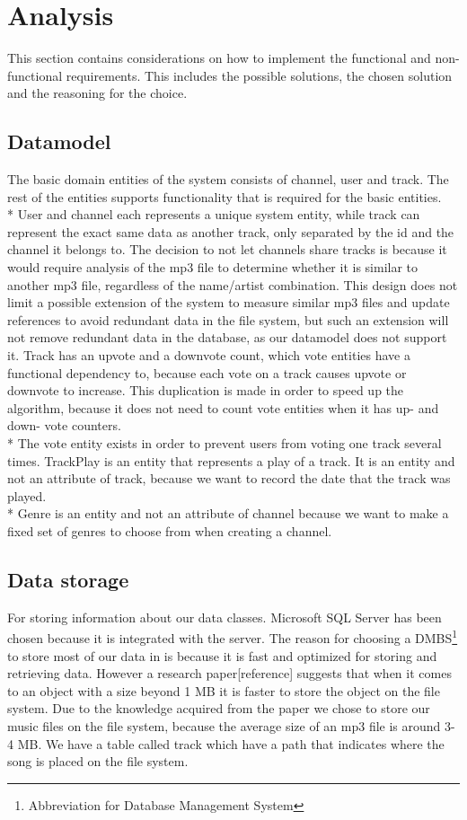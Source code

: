 \documentclass[a4paper,11pt,report]{article}
\begin{document}
\section{Analysis}
This section contains considerations on how to implement the functional and non-functional requirements. This includes the possible solutions, the chosen solution and the reasoning for the choice.

\subsection{Datamodel}
The basic domain entities of the system consists of channel, user and track. The rest of the entities supports functionality that is required for the basic entities. \\*
User and channel each represents a unique system entity, while track can represent the exact same data as another track, only separated by the id and the channel it belongs to.
The decision to not let channels share tracks is because it would require analysis of the mp3 file to determine whether it is similar to another mp3 file, regardless of the name/artist combination.
This design does not limit a possible extension of the system to measure similar mp3 files and update references to avoid redundant data in the file system, but such an extension will not remove redundant data in the database, as our datamodel does not support it. 
Track has an upvote and a downvote count, which vote entities have a functional dependency to, because each vote on a track causes upvote or downvote to increase. This duplication is made in order to speed up the algorithm, because it does not need to count vote entities when it has up- and down- vote counters. \\*
The vote entity exists in order to prevent users from voting one track several times.
TrackPlay is an entity that represents a play of a track. It is an entity and not an attribute of track, because we want to record the date that the track was played. \\*
Genre is an entity and not an attribute of channel because we want to make a fixed set of genres to choose from when creating a channel.

\subsection{Data storage}
For storing information about our data classes. Microsoft SQL Server has been chosen because it is integrated with the server. The reason for choosing a DMBS\footnote[1]{Abbreviation for Database Management System} to store most of our data in is because it is fast and optimized for storing and retrieving data. However a research paper[reference] suggests that when it comes to an object with a size beyond 1 MB it is faster to store the object on the file system. Due to the knowledge acquired from the paper we chose to store our music files on the file system, because the average size of an mp3 file is around 3-4 MB. We have a table called track which have a path that indicates where the song is placed on the file system.
\end{document}
